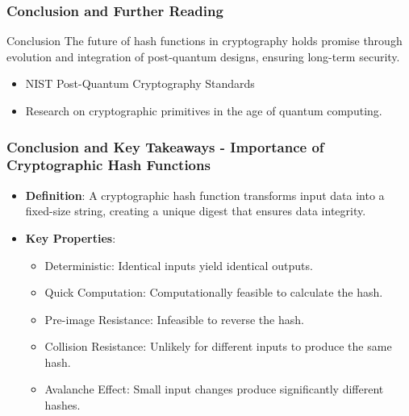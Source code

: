 \documentclass{beamer}
\begin{document}
\begin{frame}[fragile]
    \frametitle{Conclusion and Further Reading}
    \begin{block}{Conclusion}
        The future of hash functions in cryptography holds promise through evolution and integration of post-quantum designs, ensuring long-term security.
    \end{block}
    \begin{itemize}
        \item NIST Post-Quantum Cryptography Standards
        \item Research on cryptographic primitives in the age of quantum computing.
    \end{itemize}
\end{frame}

\begin{frame}[fragile]
    \frametitle{Conclusion and Key Takeaways - Importance of Cryptographic Hash Functions}
    \begin{itemize}
        \item \textbf{Definition}: A cryptographic hash function transforms input data into a fixed-size string, creating a unique digest that ensures data integrity.
        \item \textbf{Key Properties}:
        \begin{itemize}
            \item Deterministic: Identical inputs yield identical outputs.
            \item Quick Computation: Computationally feasible to calculate the hash.
            \item Pre-image Resistance: Infeasible to reverse the hash.
            \item Collision Resistance: Unlikely for different inputs to produce the same hash.
            \item Avalanche Effect: Small input changes produce significantly different hashes.
        \end{itemize}
    \end{itemize}
\end{frame}
\end{document}
